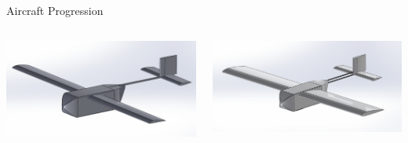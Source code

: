\documentclass{beamer}
\begin{document}
\begin{frame}{Aircraft Progression}
        \vspace{1em}
    
        \begin{columns}[T]
            \begin{column}{0.5\textwidth}
                \centering
                \includegraphics[width=\textwidth]{figures/isometrics over time/Assem2.0.0Iso.png}
                \vspace{0.5em} %
            \end{column}
    
            \begin{column}{0.5\textwidth}
                \centering
                \includegraphics[width=\textwidth]{figures/isometrics over time/Assem3.0.0Iso.png}
                \vspace{0.5em} %
            \end{column}
        \end{columns}
    \end{frame}
\end{document}
